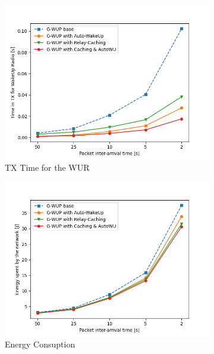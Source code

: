 \begin{figure}[H]
  \begin{subfigure}[t]{0.49\linewidth}
    \includegraphics[width=1.1\linewidth]{Contents/Images/graphs/final/tx_time.png}
    \caption{TX Time for the WUR}
    \label{fig:TXTime_final}
  \end{subfigure}
  \begin{subfigure}[t]{0.49\linewidth}
    \includegraphics[width=1.1\linewidth]{Contents/Images/graphs/final/energySpent.png}
    \caption{Energy Consuption}
    \label{fig:EnergySpent_final}
  \end{subfigure}
  \begin{subfigure}[t]{0.49\linewidth}

\end{subfigure}
\end{figure}
